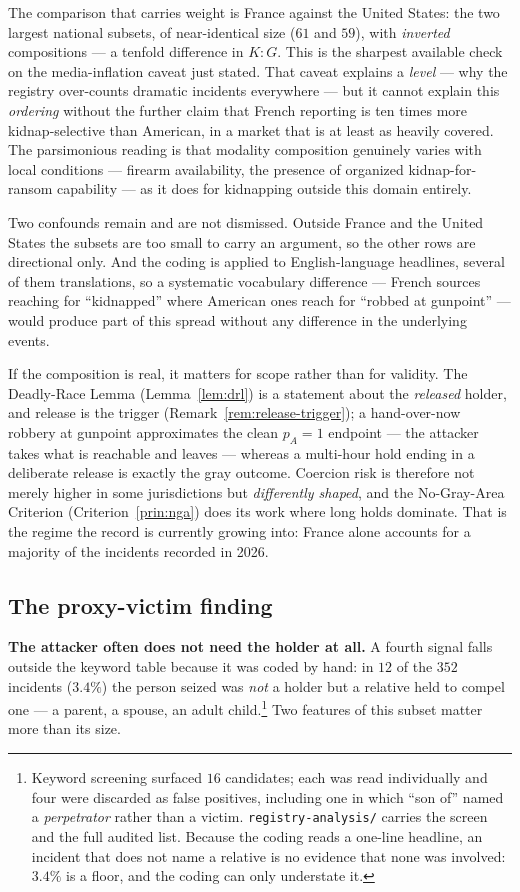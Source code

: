 \noindent The comparison that carries weight is France against the United States: the two largest
national subsets, of near-identical size ($61$ and $59$), with \emph{inverted} compositions --- a
tenfold difference in $K{:}G$. This is the sharpest available check on the media-inflation caveat
just stated. That caveat explains a \emph{level} --- why the registry over-counts dramatic incidents
everywhere --- but it cannot explain this \emph{ordering} without the further claim that French
reporting is ten times more kidnap-selective than American, in a market that is at least as heavily
covered. The parsimonious reading is that modality composition genuinely varies with local
conditions --- firearm availability, the presence of organized kidnap-for-ransom capability --- as
it does for kidnapping outside this domain entirely.

Two confounds remain and are not dismissed. Outside France and the United States the subsets are
too small to carry an argument, so the other rows are directional only. And the coding is applied to
English-language headlines, several of them translations, so a systematic vocabulary difference ---
French sources reaching for ``kidnapped'' where American ones reach for ``robbed at gunpoint'' ---
would produce part of this spread without any difference in the underlying events.

If the composition is real, it matters for scope rather than for validity. The Deadly-Race Lemma
(Lemma~\ref{lem:drl}) is a statement about the \emph{released} holder, and release is the trigger
(Remark~\ref{rem:release-trigger}); a hand-over-now robbery at gunpoint approximates the clean
$p_A = 1$ endpoint --- the attacker takes what is reachable and leaves --- whereas a multi-hour hold
ending in a deliberate release is exactly the gray outcome. Coercion risk is therefore not merely
higher in some jurisdictions but \emph{differently shaped}, and the No-Gray-Area Criterion
(Criterion~\ref{prin:nga}) does its work where long holds dominate. That is the regime the record is
currently growing into: France alone accounts for a majority of the incidents recorded in 2026.

\subsection{The proxy-victim finding}
\label{app:classify-proxy}

\medskip\noindent\textbf{The attacker often does not need the holder at all.} A fourth
signal falls outside the keyword table because it was coded by hand: in $12$ of the $352$
incidents ($3.4\%$) the person seized was \emph{not} a holder but a relative held to compel
one --- a parent, a spouse, an adult child.\footnote{Keyword screening surfaced $16$ candidates;
each was read individually and four were discarded as false positives, including one in which
``son of'' named a \emph{perpetrator} rather than a victim. \texttt{registry-analysis/} carries the
screen and the full audited list. Because the coding reads a one-line headline, an incident that
does not name a relative is no evidence that none was involved: $3.4\%$ is a floor, and the coding
can only understate it.} Two features of this subset matter more than its size.

